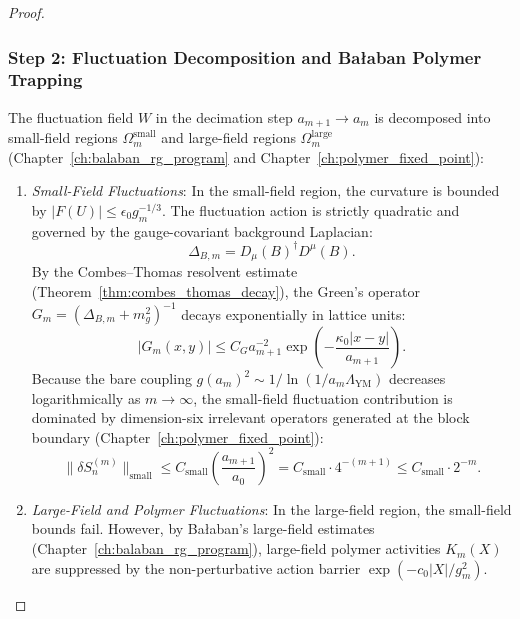 \begin{proof}
\subsubsection*{Step 2: Fluctuation Decomposition and Ba\l aban Polymer Trapping}
The fluctuation field $W$ in the decimation step $a_{m+1} \to a_m$ is decomposed into small-field regions $\Omega_m^{\mathrm{small}}$ and large-field regions $\Omega_m^{\mathrm{large}}$ (Chapter~\ref{ch:balaban_rg_program} and Chapter~\ref{ch:polymer_fixed_point}):
\begin{enumerate}[label=(\alph*)]
    \item \emph{Small-Field Fluctuations}: In the small-field region, the curvature is bounded by $|F(U)| \le \epsilon_0 g_m^{-1/3}$. The fluctuation action is strictly quadratic and governed by the gauge-covariant background Laplacian:
    \begin{equation}
    \Delta_{B, m} = D_\mu(B)^\dagger D^\mu(B).
    \end{equation}
    By the Combes--Thomas resolvent estimate (Theorem~\ref{thm:combes_thomas_decay}), the Green's operator $G_m = (\Delta_{B, m} + m_g^2)^{-1}$ decays exponentially in lattice units:
    \begin{equation}
    |G_m(x, y)| \le C_G a_{m+1}^{-2} \exp\left( -\frac{\kappa_0 |x - y|}{a_{m+1}} \right).
    \end{equation}
    Because the bare coupling $g(a_m)^2 \sim 1/\ln(1/a_m \Lambda_{\mathrm{YM}})$ decreases logarithmically as $m \to \infty$, the small-field fluctuation contribution is dominated by dimension-six irrelevant operators generated at the block boundary (Chapter~\ref{ch:polymer_fixed_point}):
    \begin{equation}
    \|\delta S_n^{(m)}\|_{\mathrm{small}} \le C_{\mathrm{small}} \left( \frac{a_{m+1}}{a_0} \right)^2 = C_{\mathrm{small}} \cdot 4^{-(m+1)} \le C_{\mathrm{small}} \cdot 2^{-m}.
    \end{equation}

    \item \emph{Large-Field and Polymer Fluctuations}: In the large-field region, the small-field bounds fail. However, by Ba\l aban's large-field estimates (Chapter~\ref{ch:balaban_rg_program}), large-field polymer activities $K_m(X)$ are suppressed by the non-perturbative action barrier $\exp(-c_0 |X| / g_m^2)$.
    

\end{enumerate}
\end{proof}
